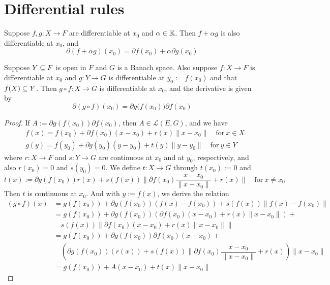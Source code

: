 \section{Differential rules}
\begin{theorem}
Suppose $f,g:X\to F$ are differentiable at $x_0$ and $\alpha\in\mathbb{K}$. Then $f+\alpha g$ is also differentiable at $x_0$, and
\[\partial(f+\alpha g)(x_0)=\partial f(x_0)+\alpha\partial g(x_0)\]
\end{theorem}
\begin{theorem}
Suppose $Y\subseteq F$ is open in $F$ and $G$ is a Banach space. Also suppose $f:X\to F$ is differentiable at $x_0$ and $g:Y\to G$ is differentiable at $y_0:=f(x_0)$ and that $f(X)\subseteq Y$. Then $g\circ f:X\to G$ is differentiable at $x_0$, and the derivative is given by
\[\partial(g\circ f)(x_0)=\partial g\big(f(x_0)\big)\partial f(x_0)\]
\end{theorem}
\begin{proof}
If $A:=\partial g(f(x_0))\partial f(x_0)$, then $A\in\mathcal{L}(E,G)$, and we have
\begin{align*}
&f(x)=f(x_0)+\partial f(x_0)(x-x_0)+r(x)\|x-x_0\|\quad\text{for}\ x\in X \\
&g(y)=f(y_0)+\partial g(y_0)(y-y_0)+t(y)\|y-y_0\|\quad\text{for}\ y\in Y
\end{align*}
where $r:X\to F$ and $s:Y \to G$ are continuous at $x_0$ and at $y_0$, respectively, and
also $r(x_0)=0$ and $s(y_0)=0$. We define $t:X \to G$ through $t(x_0):=0$ and
\[t(x):=\partial g(f(x_0))r(x)+s(f(x))\big\|\partial f(x_0)\dfrac{x-x_0}{\|x-x_0\|}+r(x)\big\|\quad\text{for}\ x\neq x_0\]
Then $t$ is continuous at $x_0$. And with $y:=f(x)$, we derive the relation
\begin{align*}
(g\circ f)(x)&=g(f(x_0))+\partial g(f(x_0))(f(x)-f(x_0))+s(f(x))\|f(x)-f(x_0)\|\\
&=g(f(x_0))+\partial g(f(x_0))(\partial f(x_0)(x-x_0)+r(x)\|x-x_0\|)+\\
&\quad s(f(x))\|\partial f(x_0)(x-x_0)+r(x)\|x-x_0\|\|\\
&=g(f(x_0))+\partial g(f(x_0))\partial f(x_0)(x-x_0)+\\
&\quad \left(\partial g(f(x_0))(r(x))+s(f(x))\|\partial f(x_0)\dfrac{x-x_0}{\|x-x_0\|}+r(x) \right)\|x-x_0\|\\
&=g(f(x_0))+A(x-x_0)+t(x)\|x-x_0\|
\end{align*}
\end{proof}
